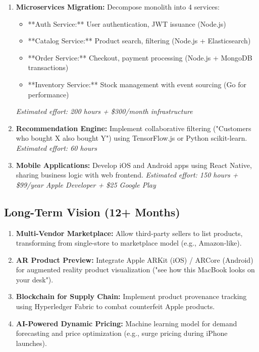 \begin{enumerate}
    \item \textbf{Microservices Migration:} Decompose monolith into 4 services:
    \begin{itemize}
        \item **Auth Service:** User authentication, JWT issuance (Node.js)
        \item **Catalog Service:** Product search, filtering (Node.js + Elasticsearch)
        \item **Order Service:** Checkout, payment processing (Node.js + MongoDB transactions)
        \item **Inventory Service:** Stock management with event sourcing (Go for performance)
    \end{itemize}
    \textit{Estimated effort: 200 hours + \$300/month infrastructure}
    
    \item \textbf{Recommendation Engine:} Implement collaborative filtering ("Customers who bought X also bought Y") using TensorFlow.js or Python scikit-learn.
    \textit{Estimated effort: 60 hours}
    
    \item \textbf{Mobile Applications:} Develop iOS and Android apps using React Native, sharing business logic with web frontend.
    \textit{Estimated effort: 150 hours + \$99/year Apple Developer + \$25 Google Play}
\end{enumerate}

\subsection{Long-Term Vision (12+ Months)}

\begin{enumerate}
    \item \textbf{Multi-Vendor Marketplace:} Allow third-party sellers to list products, transforming from single-store to marketplace model (e.g., Amazon-like).
    
    \item \textbf{AR Product Preview:} Integrate Apple ARKit (iOS) / ARCore (Android) for augmented reality product visualization ("see how this MacBook looks on your desk").
    
    \item \textbf{Blockchain for Supply Chain:} Implement product provenance tracking using Hyperledger Fabric to combat counterfeit Apple products.
    
    \item \textbf{AI-Powered Dynamic Pricing:} Machine learning model for demand forecasting and price optimization (e.g., surge pricing during iPhone launches).
\end{enumerate}

